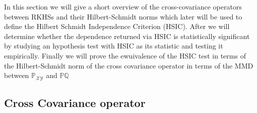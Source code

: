 
In this section we will give a short overview of the cross-covariance operators between RKHSs and their Hilbert-Schmidt norms which later will be used to define the Hilbert Schmidt Independence Criterion (HSIC).
After we will determine whether the dependence returned via HSIC is statistically significant by studying an hypothesis test with HSIC as its statistic and testing it empirically.
Finally we will prove the ewuivalence of the HSIC test in terms of the Hilbert-Schmidt norm of the cross covariance operator in terms of the MMD between $\mathbb{P}_{\mathcal{X}\mathcal{Y}}$ and $\mathbb{P}\mathbb{Q}$

\subsection{Cross Covariance operator}

